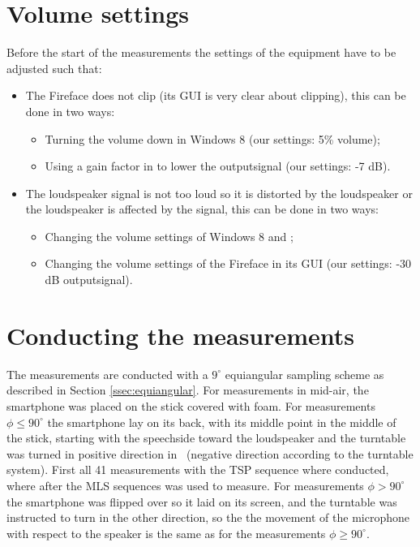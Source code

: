 \section{Volume settings}
Before the start of the measurements the settings of the equipment have to be adjusted such that:
\begin{itemize}
\item The Fireface does not clip (its GUI is very clear about clipping), this can be done in two ways:
\begin{itemize}
\item Turning the volume down in Windows 8 (our settings: 5\% volume);
\item Using a gain factor in {\matlab} to lower the outputsignal (our settings: -7 dB).
\end{itemize}
\item The loudspeaker signal is not too loud so it is distorted by the loudspeaker or the loudspeaker is affected by the signal, this can be done in two ways:
\begin{itemize}
\item Changing the volume settings of Windows 8 and \matlab;
\item Changing the volume settings of the Fireface in its GUI (our settings: -30 dB outputsignal).
\end{itemize}
\end{itemize}

\section{Conducting the measurements}
The measurements are conducted with a $9^\circ$ equiangular sampling scheme as described in Section \ref{ssec:equiangular}.
For measurements in mid-air, the smartphone was placed on the stick covered with foam.
For measurements $\phi\leq90^\circ$ the smartphone lay on its back, with its middle point in the middle of the stick, starting with the speechside toward the loudspeaker and the turntable was turned in positive direction in \matlab~(negative direction according to the turntable system).
First all 41 measurements with the TSP sequence where conducted, where after the MLS sequences was used to measure.
For measurements $\phi>90^\circ$ the smartphone was flipped over so it laid on its screen, and the turntable was instructed to turn in the other direction, so the the movement of the microphone with respect to the speaker is the same as for the measurements $\phi\geq90^\circ$.

